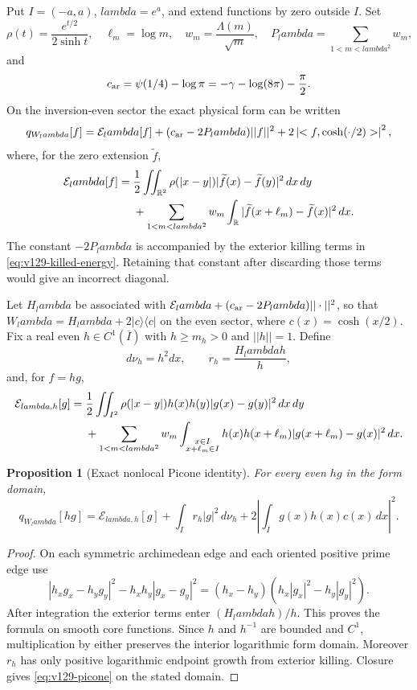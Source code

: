 \documentclass[11pt]{article}
\def\lambda{lambda}%
\def\norm#1{||#1||}%
\def\ip#1#2{<#1,#2>}%
\newtheorem{proposition}[theorem]{Proposition}
\theoremstyle{remark}
\newcommand{\norm}[1]{\left\lVert #1\right\rVert}
\newcommand{\ip}[2]{\left\langle #1,#2\right\rangle}
\begin{document}
Put $I=(-a,a)$, $\lambda=e^a$, and extend functions by zero outside
$I$. Set
\[
 \rho(t)=\frac{e^{t/2}}{2\sinh t},\quad
 \ell_m=\log m,\quad w_m=\frac{\Lambda(m)}{\sqrt m},\quad
 P_\lambda=\sum_{1<m<\lambda^2}w_m,
\]
and
\[
 c_{\rm ar}=\psi(1/4)-\log\pi
 =-\gamma-\log(8\pi)-\frac\pi2.
\]
On the inversion-even sector the exact physical form can be written
\begin{equation}\label{eq:v129-jump-decomposition}
 q_{W_\lambda}[f]=\mathcal E_\lambda[f]
 +(c_{\rm ar}-2P_\lambda)\norm f^2
 +2\left|\ip f{\cosh(\cdot/2)}\right|^2,
\end{equation}
where, for the zero extension $\widetilde f$,
\begin{align}
 \mathcal E_\lambda[f]
 ={}&\frac12\iint_{\mathbb R^2}\rho(|x-y|)
       |\widetilde f(x)-\widetilde f(y)|^2\,dx\,dy \notag\\
 &+\sum_{1<m<\lambda^2}w_m\int_{\mathbb R}
       |\widetilde f(x+\ell_m)-\widetilde f(x)|^2\,dx .
 \label{eq:v129-killed-energy}
\end{align}
The constant $-2P_\lambda$ is accompanied by the exterior killing
terms in \eqref{eq:v129-killed-energy}. Retaining that constant after
discarding those terms would give an incorrect diagonal.

Let $H_\lambda$ be associated with
$\mathcal E_\lambda+(c_{\rm ar}-2P_\lambda)\norm{\cdot}^2$, so that
$W_\lambda=H_\lambda+2|c\rangle\langle c|$ on the even sector, where
$c(x)=\cosh(x/2)$. Fix a real even $h\in C^1(\overline I)$ with
$h\ge m_h>0$ and $\norm h=1$. Define
\[
 d\nu_h=h^2dx,\qquad r_h=\frac{H_\lambda h}{h},
\]
and, for $f=hg$,
\begin{align}
 \mathcal E_{\lambda,h}[g]
 ={}&\frac12\iint_{I^2}\rho(|x-y|)h(x)h(y)
                |g(x)-g(y)|^2\,dx\,dy \notag\\
 &+\sum_{1<m<\lambda^2}w_m
   \int_{\substack{x\in I\\x+\ell_m\in I}}
       h(x)h(x+\ell_m)|g(x+\ell_m)-g(x)|^2\,dx .
 \label{eq:v129-transformed-energy}
\end{align}

\begin{proposition}[Exact nonlocal Picone identity]
\label{prop:v129-picone}
For every even $hg$ in the form domain,
\begin{equation}\label{eq:v129-picone}
 q_{W_\lambda}[hg]=\mathcal E_{\lambda,h}[g]
 +\int_I r_h|g|^2\,d\nu_h
 +2\left|\int_I g(x)h(x)c(x)\,dx\right|^2.
\end{equation}
\end{proposition}
\begin{proof}
On each symmetric archimedean edge and each oriented positive prime
edge use
\[
 |h_xg_x-h_yg_y|^2-h_xh_y|g_x-g_y|^2
 =(h_x-h_y)(h_x|g_x|^2-h_y|g_y|^2).
\]
After integration the exterior terms enter $(H_\lambda h)/h$. This
proves the formula on smooth core functions. Since $h$ and $h^{-1}$
are bounded and $C^1$, multiplication by either preserves the interior
logarithmic form domain. Moreover $r_h$ has only positive logarithmic
endpoint growth from exterior killing. Closure gives
\eqref{eq:v129-picone} on the stated domain.
\end{proof}
\end{document}
